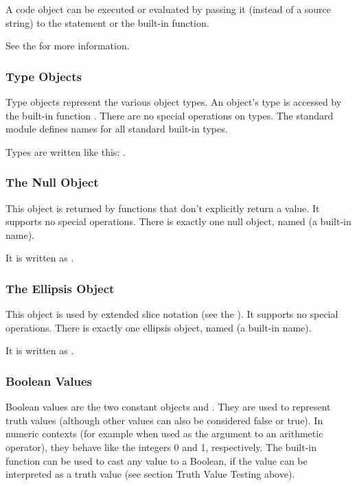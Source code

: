 A code object can be executed or evaluated by passing it (instead of a
source string) to the  statement or the built-in
 function.

See the  for more
information.


\subsubsection{Type Objects \label{bltin-type-objects}}

Type objects represent the various object types.  An object's type is
accessed by the built-in function .  There are no special
operations on types.  The standard module  defines names
for all standard built-in types.

Types are written like this: .


\subsubsection{The Null Object \label{bltin-null-object}}

This object is returned by functions that don't explicitly return a
value.  It supports no special operations.  There is exactly one null
object, named  (a built-in name).

It is written as .


\subsubsection{The Ellipsis Object \label{bltin-ellipsis-object}}

This object is used by extended slice notation (see the
).  It supports no
special operations.  There is exactly one ellipsis object, named
 (a built-in name).

It is written as .

\subsubsection{Boolean Values}

Boolean values are the two constant objects  and
.  They are used to represent truth values (although other
values can also be considered false or true).  In numeric contexts
(for example when used as the argument to an arithmetic operator),
they behave like the integers 0 and 1, respectively.  The built-in
function  can be used to cast any value to a Boolean,
if the value can be interpreted as a truth value (see section Truth
Value Testing above).

